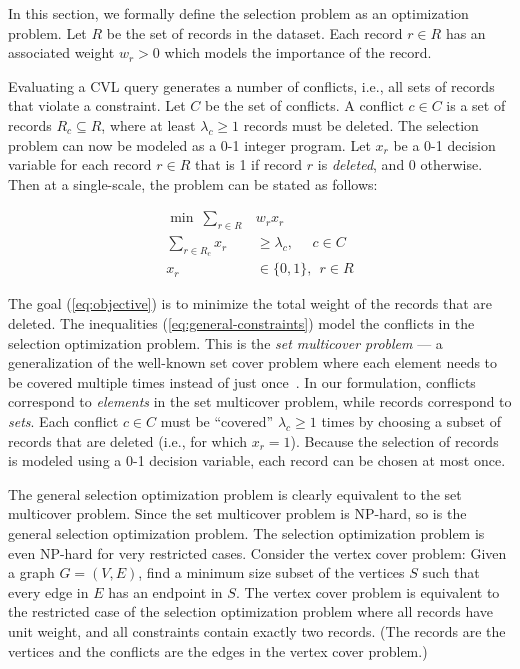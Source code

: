 \documentclass[11pt, oneside]{report}
\begin{document}
{In this section, we formally define the selection problem as an optimization problem. Let $R$ be the set of records in the dataset. Each record $r \in R$ has an associated weight $w_r > 0$ which models the importance of the record. 

Evaluating a CVL query generates a number of conflicts, i.e., all sets of records that violate a constraint. Let $C$ be the set of conflicts. A conflict $c \in C$ is a set of records $R_c \subseteq R$, where at least $\lambda_c \geq 1$ records must be deleted. The selection problem can now be modeled as a 0-1 integer program. Let $x_r$ be a 0-1 decision variable for each record $r \in R$ that is 1 if record $r$ is \emph{deleted}, and 0 otherwise. Then at a single-scale, the problem can be stated as follows:

\begin{align}
  \label{eq:objective}
  \min ~\sum_{r \in R} &w_r x_r \\
  \label{eq:general-constraints}
  \sum_{r \in R_c} x_r &\geq \lambda_c, ~~~~~~ c \in C \\
  x_r & \in \{0, 1\}, ~~ r \in R
\end{align}

The goal (\ref{eq:objective}) is to minimize the total weight of the records that are deleted. The inequalities (\ref{eq:general-constraints}) model the conflicts in the selection optimization problem. This is the \emph{set multicover problem} --- a generalization of the well-known set cover problem where each element needs to be covered multiple times instead of just once~\cite{rajagopalan1998primal}. In our formulation, conflicts correspond to \textit{elements} in the set multicover problem, while records correspond to \textit{sets}. Each conflict $c \in C$ must be ``covered'' $\lambda_c \geq 1$ times by choosing a subset of records that are deleted (i.e., for which $x_r=1$). Because the selection of records is modeled using a 0-1 decision variable, each record can be chosen at most once.

The general selection optimization problem is clearly equivalent to the set multicover problem. Since the set multicover problem is NP-hard, so is the general selection optimization problem. The selection optimization problem is even NP-hard for very restricted cases. Consider the vertex cover problem: Given a graph $G=(V,E)$, find a minimum size subset of the vertices $S$ such that every edge in $E$ has an endpoint in $S$. The vertex cover problem is equivalent to the restricted case of the selection optimization problem where all records have unit weight, and all constraints contain exactly two records. (The records are the vertices and the conflicts are the edges in the vertex cover problem.)

}
\end{document}
